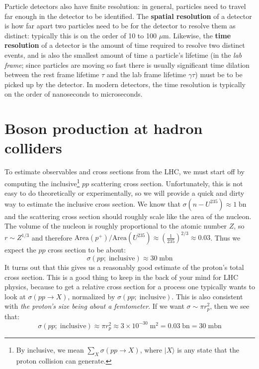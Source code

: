\documentclass[11pt, oneside]{article}   	%
\theoremstyle{definition}
\numberwithin{equation}{subsection}		%
\begin{document}
Particle detectors also have finite resolution: in general, particles need to travel far enough in the detector to be identified. The 
\textbf{spatial resolution} of a detector is how far apart two particles need to be for the detector to resolve them as distinct: typically this 
is on the order of 10 to 100 $\mu$m. Likewise, the \textbf{time resolution} of a detector is the amount of time required to resolve two 
distinct events, and is also the smallest amount of time a particle's lifetime (in the \textit{lab frame}; since particles are moving so fast there 
is usually significant time dilation between the rest frame lifetime $\tau$ and the lab frame lifetime $\gamma\tau$) must be to be picked up by 
the detector. In modern detectors, the time resolution is typically on the order of nanoseconds to microseconds.


\newpage
\section{Boson production at hadron colliders}

To estimate observables and cross sections from the LHC, we must start off by computing the inclusive\footnote{By inclusive, we mean 
$\sum_X\sigma(pp\rightarrow X)$, where $|X\rangle$ is any state that the proton collision can generate.} $pp$ scattering cross section. 
Unfortunately, this is not easy to do theoretically or experimentally, so we will provide a quick and dirty way to estimate the inclusive cross 
section. We know that $\sigma(n-U^{235})\approx 1\;\mathrm{bn}$ and the scattering cross section should roughly scale like the area of the 
nucleon. The volume of the nucleon is roughly proportional to the atomic number $Z$, so $r\sim Z^{1/3}$ and therefore $\mathrm{Area}
(p^+) / \mathrm{Area}(U^{235})\approx \left(\frac{1}{235}\right)^{2/3}\approx 0.03$. Thus we expect the $pp$ cross section to be about:
\begin{equation}
	\sigma(pp; \;\mathrm{inclusive})\approx 30 \;\mathrm{mbn}
\end{equation}
It turns out that this gives us a reasonably good estimate of the proton's total cross section. This is a good thing to keep in the back of your 
mind for LHC physics, because to get a relative cross section for a process one typically wants to look at $\sigma(pp\rightarrow X)$, 
normalized by $\sigma(pp;\;\mathrm{inclusive})$. This is also consistent with \textit{the proton's size being about a femtometer}. If we 
want $\sigma\sim\pi r_p^2$, then we see that:
\begin{equation}
	\sigma(pp; \;\mathrm{inclusive})\approx\pi r_p^2 \approx 3\times 10^{-30} \;\mathrm{m}^2 = 0.03 \;\mathrm{bn} = 30\;\mathrm{mbn}
\end{equation}
\end{document}
